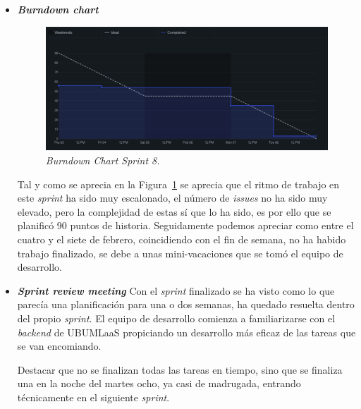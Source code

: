 \begin{itemize}
\item \textbf{\textit{Burndown chart}}
\begin{figure}
\begin{center}
\includegraphics[width=\textwidth]{../img/anexos/sprints/BD-Sprint8}
\caption{\textit{Burndown Chart Sprint 8.}}\label{fig:BD-Sprint8}
\end{center}
\end{figure}

Tal y como se aprecia en la Figura~\ref{fig:BD-Sprint8} se aprecia que el ritmo de trabajo en este \textit{sprint} ha sido muy escalonado, el número de \textit{issues} no ha sido muy elevado, pero la complejidad de estas sí que lo ha sido, es por ello que se planificó 90 puntos de historia. Seguidamente podemos apreciar como entre el cuatro y el siete de febrero, coincidiendo con el fin de semana, no ha habido trabajo finalizado, se debe a unas mini-vacaciones que se tomó el equipo de desarrollo.

\item \textbf{\textit{Sprint review meeting}}
Con el \textit{sprint} finalizado se ha visto como lo que parecía una planificación para una o dos semanas, ha quedado resuelta dentro del propio \textit{sprint}. El equipo de desarrollo comienza a familiarizarse con el \textit{backend} de UBUMLaaS propiciando un desarrollo más eficaz de las tareas que se van encomiando.

Destacar que no se finalizan todas las tareas en tiempo, sino que se finaliza una en la noche del martes ocho, ya casi de madrugada, entrando técnicamente en el siguiente \textit{sprint}.

\end{itemize}

